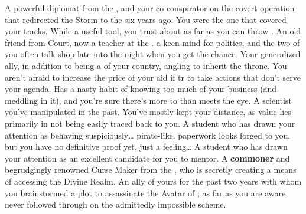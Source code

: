 \documentclass[char]{GL2020}
\begin{document}
\begin{contacts}
    \contact{\cDiplomat{}} A powerful diplomat from the \pTech{}, and your co-conspirator on the covert operation that redirected the Storm to the \pShip{} six years ago. You were the one that covered your tracks. While \cDiplomat{\theyare} a useful tool, you trust \cDiplomat{\them} about as far as you can throw \cDiplomat{\them}.
    \contact{\cHistory{}} An old friend from Court, now a teacher at the \pSc{}. \cHistory{\theyhave} a keen mind for politics, and the two of you often talk shop late into the night when you get the chance.
    \contact{\cPrince{}} Your generalized ally, in addition to being a \cPrince{\Heir} of your country, angling to inherit the throne. You aren’t afraid to increase the price of your aid if \cPrince{\they} tr\cPrince{\verby} to take actions that don’t serve your agenda.
    \contact{\cInterpol{}} Has a nasty habit of knowing too much of your business (and meddling in it), and you're sure there's more to \cInterpol{\them} than meets the eye.
    \contact{\cHeadScientist{}} A scientist you've manipulated in the past. You've mostly kept your distance, as \cHeadScientist{\their} value lies primarily in \cHeadScientist{\them} not being easily traced back to you.
    \contact{\cPirateChild{}} A student who has drawn your attention as behaving suspiciously\ldots{} pirate-like. \cPirateChild{\Their} paperwork looks forged to you, but you have no definitive proof yet, just a feeling\ldots{}
     \contact{\cLibAssist{}} A student who has drawn your attention as an excellent candidate for you to mentor.
    \contact{\cCurse{}} A \textbf{commoner} and begrudgingly renowned Curse Maker from the \pFarm{}, who is secretly creating a means of accessing the Divine Realm.
    \contact{\cAntiChup{}} An ally of yours for the past two years with whom you brainstormed a plot to assassinate the Avatar of \cEbb{}; as far as you are aware, \cAntiChup{\they} never followed through on the admittedly impossible scheme.
\end{contacts}
\end{document}
